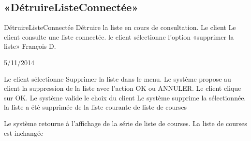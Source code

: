 \subsection{«DétruireListeConnectée»}

\startCU
\nom DétruireListeConnectée
\but Détruire la liste en cours de consultation.
\acteur Le client
\precondition Le client consulte une liste connectée.
\declenchement le client sélectionne l'option «supprimer la liste»
\auteur François D.
\date 05/11/2014

\nominal %
\startnominal
\etape Le client sélectionne Supprimer la liste dans le menu.
\etape Le système propose au client la suppression de la liste avec l'action OK ou ANNULER.
 Le client clique sur OK.
\etape Le système valide le choix du client
\etape Le système supprime la sélectionnée.
\stopnominal
\postcondition la liste a été supprimée de la liste courante de liste de courses


\exception 
{} 
  \etape Le système retourne à l'affichage de la série de liste de courses.
\stopcondition
\postcondition La liste de courses est inchangée
\stopalternatif
\stopCU
